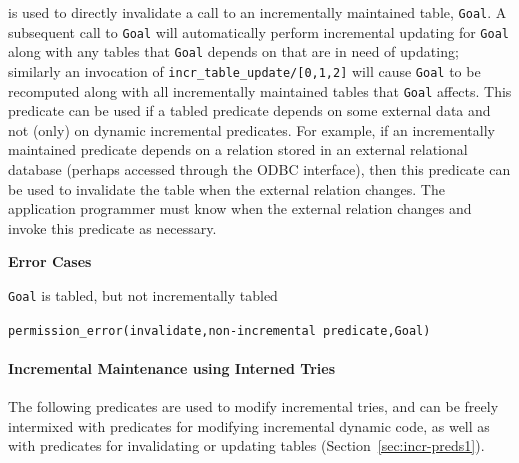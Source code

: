 \begin{description}
is used to directly invalidate a call to an incrementally maintained
table, {\tt Goal}.  A subsequent call to {\tt Goal} will automatically
perform incremental updating for {\tt Goal} along with any tables that
{\tt Goal} depends on that are in need of updating; similarly an
invocation of {\tt incr\_table\_update/[0,1,2]} will cause {\tt Goal}
to be recomputed along with all incrementally maintained tables that
{\tt Goal} affects.  This predicate can be used if a tabled predicate
depends on some external data and not (only) on dynamic incremental
predicates.  For example, if an incrementally maintained predicate
depends on a relation stored in an external relational database
(perhaps accessed through the ODBC interface), then this predicate can
be used to invalidate the table when the external relation changes.
The application programmer must know when the external relation
changes and invoke this predicate as necessary.

{\bf Error Cases}
\bi
\item 	{\tt Goal} is tabled, but not incrementally tabled
\bi
\item 	{\tt permission\_error(invalidate,non-incremental predicate,Goal)}
\ei
\ei

\end{description}

\paragraph{Incremental Maintenance using Interned Tries}
The following predicates are used to modify incremental tries, and can
be freely intermixed with predicates for modifying incremental dynamic
code, as well as with predicates for invalidating or updating tables
(Section~\ref{sec:incr-preds1}).

